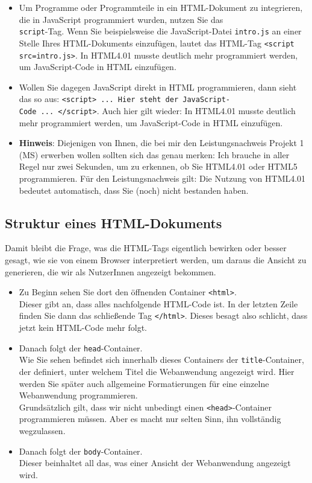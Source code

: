 \begin{itemize}
	\item Um Programme oder Programmteile in ein HTML-Dokument zu integrieren, die in JavaScript programmiert wurden, nutzen Sie das\\ \verb|script|-Tag. Wenn Sie beispielsweise die JavaScript-Datei \verb|intro.js| an einer Stelle Ihres HTML-Dokuments einzufügen, lautet das HTML-Tag \verb|<script src=intro.js>|. In HTML4.01 musste deutlich mehr programmiert werden, um JavaScript-Code in HTML einzufügen.
	\item Wollen Sie dagegen JavaScript direkt in HTML programmieren, dann sieht das so aus: \verb|<script> ... Hier steht der JavaScript-|\\\verb|Code ... </script>|. Auch hier gilt wieder: In HTML4.01 musste deutlich mehr programmiert werden, um JavaScript-Code in HTML einzufügen.
	\item \textbf{Hinweis}: Diejenigen von Ihnen, die bei mir den Leistungsnachweis \glqq{}Projekt 1 (MS)\grqq{} erwerben wollen sollten sich das genau merken: Ich brauche in aller Regel nur zwei Sekunden, um zu erkennen, ob Sie HTML4.01 oder HTML5 programmieren. Für den Leistungsnachweis gilt: Die Nutzung von HTML4.01 bedeutet automatisch, dass Sie (noch) nicht bestanden haben.
\end{itemize}

\subsection{Struktur eines HTML-Dokuments}

Damit bleibt die Frage, was die HTML-Tags eigentlich bewirken oder besser gesagt, wie sie von einem Browser interpretiert werden, um daraus die Ansicht zu generieren, die wir als NutzerInnen angezeigt bekommen.\\

\begin{itemize}
	\item Zu Beginn sehen Sie dort den öffnenden Container \verb|<html>|.\\
	Dieser gibt an, dass alles nachfolgende HTML-Code ist. In der letzten Zeile finden Sie dann das schließende Tag \verb|</html>|. Dieses besagt also schlicht, dass jetzt kein HTML-Code mehr folgt.
	\item Danach folgt der \verb|head|-Container.\\
	Wie Sie sehen befindet sich innerhalb dieses Containers der \verb|title|-Container, der definiert, unter welchem Titel die Webanwendung angezeigt wird. Hier werden Sie später auch allgemeine Formatierungen für eine einzelne Webanwendung programmieren.\\
	Grundsätzlich gilt, dass wir nicht unbedingt einen \verb|<head>|-Container programmieren müssen. Aber es macht nur selten Sinn, ihn vollständig wegzulassen.
	\item Danach folgt der \verb|body|-Container.\\
	Dieser beinhaltet all das, was einer Ansicht der Webanwendung angezeigt wird.
\end{itemize}

